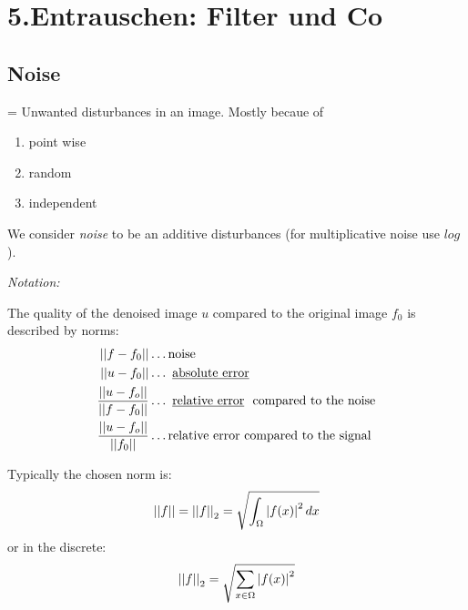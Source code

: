 \chapter{5.Entrauschen: Filter und Co}
	\section{Noise}
		 = Unwanted disturbances in an image. Mostly becaue of 
		\begin{enumerate}[-]
			\item point wise
			\item random
			\item independent
		\end{enumerate}
				We consider \emph{noise} to be an additive disturbances (for multiplicative noise use $log$).

		\emph{Notation:}
		\begin{center}
		\end{center}

		The quality of the denoised image $u$ compared to the original image $f_0$ is described by norms:
		\[
				\begin{aligned}
								\norm{f-f_0} & \dots \text{noise}\\
						\norm{u-f_0} & \dots \text{\mim{absolute error}}\\
						\frac{\norm{u-f_o}}{\norm{f-f_0}} & \dots \text{\mim{relative error} compared to the noise}\\
						\frac{\norm{u-f_o}}{\norm{f_0}} & \dots \text{relative error compared to the signal}
				\end{aligned}
				\]
		
		Typically the chosen norm is:
		\[\left\lvert \left\lvert f \right\rvert \right\rvert = \left\lvert \left\lvert f \right\rvert \right\rvert_2 = \sqrt{\int_{\Omega} \left\lvert f(x) \right\rvert^2 dx}\]
		or in the discrete:
		\[\left\lvert \left\lvert f \right\rvert \right\rvert_2=\sqrt{\sum_{x \in \Omega} \left\lvert f(x) \right\rvert^2}\]


